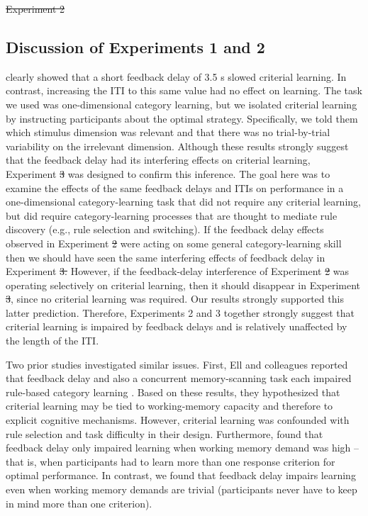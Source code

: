 \documentclass[doc, floatsintext]{apa7}
\providecommand{\DIFadd}[1]{{\protect\color{blue}\uwave{#1}}} %
\providecommand{\DIFdel}[1]{{\protect\color{red}\sout{#1}}}                      %
\providecommand{\DIFaddbegin}{} %
\providecommand{\DIFaddend}{} %
\providecommand{\DIFdelbegin}{} %
\providecommand{\DIFdelend}{} %
\newcommand{\DIFscaledelfig}{0.5}
\newlength{\DIFdelgraphicswidth} %
\newlength{\DIFdelgraphicsheight} %
\newcommand{\DIFaddincludegraphics}[2][]{{\color{blue}\fbox{\DIFOincludegraphics[#1]{#2}}}} %
\newcommand{\DIFdelincludegraphics}[2][]{%
\sbox{\DIFdelgraphicsbox}{\DIFOincludegraphics[#1]{#2}}%
\settoboxwidth{\DIFdelgraphicswidth}{\DIFdelgraphicsbox} %
\settoboxtotalheight{\DIFdelgraphicsheight}{\DIFdelgraphicsbox} %
\scalebox{\DIFscaledelfig}{%
\parbox[b]{\DIFdelgraphicswidth}{\usebox{\DIFdelgraphicsbox}\\[-\baselineskip] \rule{\DIFdelgraphicswidth}{0em}}\llap{\resizebox{\DIFdelgraphicswidth}{\DIFdelgraphicsheight}{%
\setlength{\unitlength}{\DIFdelgraphicswidth}%
\begin{picture}(1,1)%
\thicklines\linethickness{2pt} %
{\color[rgb]{1,0,0}\put(0,0){\framebox(1,1){}}}%
{\color[rgb]{1,0,0}\put(0,0){\line( 1,1){1}}}%
{\color[rgb]{1,0,0}\put(0,1){\line(1,-1){1}}}%
\end{picture}%
}\hspace*{3pt}}} %
} %
\DeclareRobustCommand{\DIFaddbegin}{\DIFOaddbegin \let\includegraphics\DIFaddincludegraphics} %
\DeclareRobustCommand{\DIFaddend}{\DIFOaddend \let\includegraphics\DIFOincludegraphics} %
\DeclareRobustCommand{\DIFdelbegin}{\DIFOdelbegin \let\includegraphics\DIFdelincludegraphics} %
\DeclareRobustCommand{\DIFdelend}{\DIFOaddend \let\includegraphics\DIFOincludegraphics} %
\begin{document}
\DIFdelbegin %
\DIFdel{Experiment 2 }\DIFdelend \DIFaddbegin \subsection{Discussion of Experiments 1 and 2}
\DIFadd{Experiment 1 }\DIFaddend clearly showed that a short feedback delay of
3.5 s slowed criterial learning. In contrast, increasing the
ITI to this same value had no effect on learning. The task
we used was one-dimensional category learning, but we
isolated criterial learning by instructing participants
about the optimal strategy. Specifically, we told them which
stimulus dimension was relevant and that there was no
trial-by-trial variability on the irrelevant dimension.
Although these results strongly suggest that the feedback
delay had its interfering effects on criterial learning,
Experiment \DIFdelbegin \DIFdel{3 }\DIFdelend \DIFaddbegin \DIFadd{2 }\DIFaddend was designed to confirm this inference. The
goal here was to examine the effects of the same feedback
delays and ITIs on performance in a one-dimensional
category-learning task that did not require any criterial
learning, but did require category-learning processes that
are thought to mediate rule discovery (e.g., rule selection
and switching). If the feedback delay effects observed in
Experiment \DIFdelbegin \DIFdel{2 }\DIFdelend \DIFaddbegin \DIFadd{1 }\DIFaddend were acting on some general category-learning
skill then we should have seen the same interfering effects
of feedback delay in Experiment \DIFdelbegin \DIFdel{3. }\DIFdelend \DIFaddbegin \DIFadd{2. }\DIFaddend However, if the
feedback-delay interference of Experiment \DIFdelbegin \DIFdel{2 }\DIFdelend \DIFaddbegin \DIFadd{1 }\DIFaddend was operating
selectively on criterial learning, then it should disappear
in Experiment \DIFdelbegin \DIFdel{3}\DIFdelend \DIFaddbegin \DIFadd{2}\DIFaddend , since no criterial learning was required.
Our results strongly supported this latter prediction.
Therefore, Experiments 2 and 3 together strongly suggest
that criterial learning is impaired by feedback delays and
is relatively unaffected by the length of the ITI.

Two prior studies investigated similar issues. First, Ell
and colleagues reported that feedback delay and also a
concurrent memory-scanning task each impaired rule-based
category learning \parencite{ell2009critrial}. Based on
these results, they hypothesized that criterial learning may
be tied to working-memory capacity and therefore to explicit
cognitive mechanisms. However, criterial learning was
confounded with rule selection and task difficulty in their
design.  Furthermore, \textcite{ell2009critrial} found that
feedback delay only impaired learning when working memory
demand was high -- that is, when participants had to learn
more than one response criterion for optimal performance. In
contrast, we found that feedback delay impairs learning even
when working memory demands are trivial (participants never
have to keep in mind more than one criterion).
\end{document}
